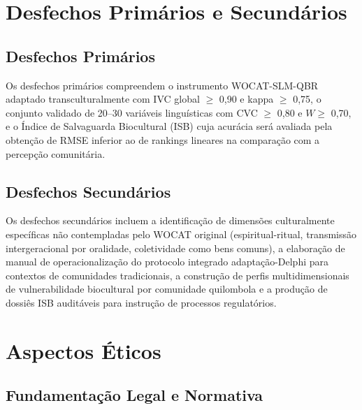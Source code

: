 \documentclass[12pt,a4paper,brazil]{article}
\begin{document}
\section{Desfechos Primários e Secundários}

\subsection{Desfechos Primários}

Os desfechos primários compreendem o instrumento WOCAT-SLM-QBR adaptado transculturalmente com IVC global $\geq$ 0,90 e kappa $\geq$ 0,75, o conjunto validado de 20--30 variáveis linguísticas com CVC $\geq$ 0,80 e $W \geq$ 0,70, e o Índice de Salvaguarda Biocultural (ISB) cuja acurácia será avaliada pela obtenção de RMSE inferior ao de rankings lineares na comparação com a percepção comunitária.

\subsection{Desfechos Secundários}

Os desfechos secundários incluem a identificação de dimensões culturalmente específicas não contempladas pelo WOCAT original (espiritual-ritual, transmissão intergeracional por oralidade, coletividade como bens comuns), a elaboração de manual de operacionalização do protocolo integrado adaptação-Delphi para contextos de comunidades tradicionais, a construção de perfis multidimensionais de vulnerabilidade biocultural por comunidade quilombola e a produção de dossiês ISB auditáveis para instrução de processos regulatórios.


\section{Aspectos Éticos}

\subsection{Fundamentação Legal e Normativa}
\end{document}
